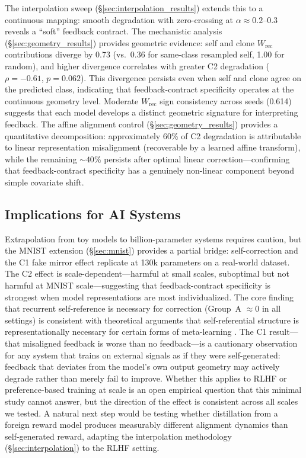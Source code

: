 \documentclass[10pt]{article}
\begin{document}
The interpolation sweep (\S\ref{sec:interpolation_results}) extends this to a continuous mapping: smooth degradation with zero-crossing at $\alpha \approx 0.2$--$0.3$ reveals a ``soft'' feedback contract. The mechanistic analysis (\S\ref{sec:geometry_results}) provides geometric evidence: self and clone $W_\text{rec}$ contributions diverge by 0.73 (vs.\ 0.36 for same-class resampled self, 1.00 for random), and higher divergence correlates with greater C2 degradation ($\rho = -0.61$, $p = 0.062$). This divergence persists even when self and clone agree on the predicted class, indicating that feedback-contract specificity operates at the continuous geometry level. Moderate $W_\text{rec}$ sign consistency across seeds (0.614) suggests that each model develops a distinct geometric signature for interpreting feedback. The affine alignment control (\S\ref{sec:geometry_results}) provides a quantitative decomposition: approximately 60\% of C2 degradation is attributable to linear representation misalignment (recoverable by a learned affine transform), while the remaining ${\sim}40\%$ persists after optimal linear correction---confirming that feedback-contract specificity has a genuinely non-linear component beyond simple covariate shift.

\subsection{Implications for AI Systems}

Extrapolation from toy models to billion-parameter systems requires caution, but the MNIST extension (\S\ref{sec:mnist}) provides a partial bridge: self-correction and the C1 fake mirror effect replicate at 130k parameters on a real-world dataset. The C2 effect is scale-dependent---harmful at small scales, suboptimal but not harmful at MNIST scale---suggesting that feedback-contract specificity is strongest when model representations are most individualized. The core finding that recurrent self-reference is necessary for correction (Group~A $\approx 0$ in all settings) is consistent with theoretical arguments that self-referential structure is representationally necessary for certain forms of meta-learning \citep{kirsch2022eliminating}. The C1 result---that misaligned feedback is worse than no feedback---is a cautionary observation for any system that trains on external signals as if they were self-generated: feedback that deviates from the model's own output geometry may actively degrade rather than merely fail to improve. Whether this applies to RLHF or preference-based training at scale is an open empirical question that this minimal study cannot answer, but the direction of the effect is consistent across all scales we tested. A natural next step would be testing whether distillation from a foreign reward model produces measurably different alignment dynamics than self-generated reward, adapting the interpolation methodology (\S\ref{sec:interpolation}) to the RLHF setting.
\end{document}
